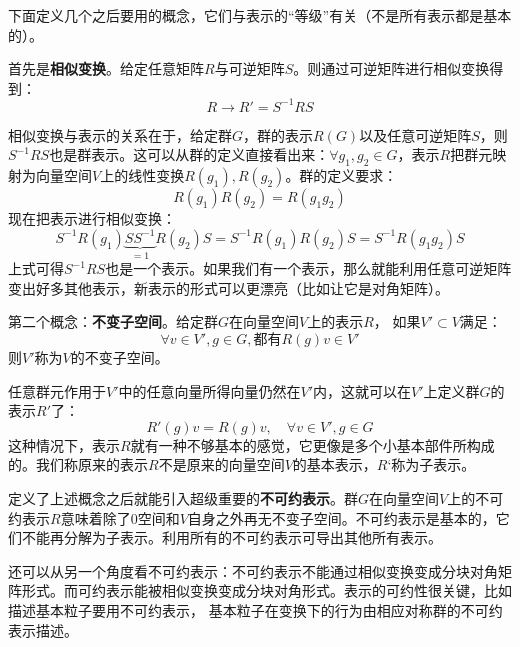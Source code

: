 下面定义几个之后要用的概念，它们与表示的“等级”有关（不是所有表示都是基本的）。


首先是{\bf 相似变换}。给定任意矩阵$R$与可逆矩阵$S$。则通过可逆矩阵进行相似变换得到：
\begin{equation}
\label{equ3.89}
R \rightarrow R' = S^{-1} RS
\end{equation}

相似变换与表示的关系在于，给定群$G$，群的表示$R(G)$以及任意可逆矩阵$S$，则$S^{-1} RS$也是群表示。这可以从群的定义直接看出来：$\forall g_1, g_2 \in G$，表示$R$把群元映射为向量空间$V$上的线性变换$R(g_1),R(g_2)$。群的定义要求：
\begin{equation}
\label{equ3.90}
R(g_1) R(g_2) = R(g_1 g_2)
\end{equation}
现在把表示进行相似变换：
\begin{equation}
\label{equ3.91}
S^{-1} R(g_1) \underbrace{SS^{-1}}_{=1} R(g_2) S = S^{-1} R(g_1) R(g_2) S = S^{-1} R(g_1 g_2) S
\end{equation}
上式可得$S^{-1} RS$也是一个表示。如果我们有一个表示，那么就能利用任意可逆矩阵变出好多其他表示，新表示的形式可以更漂亮（比如让它是对角矩阵）。

第二个概念：{\bf 不变子空间}。给定群$G$在向量空间$V$上的表示$R$， 如果$V' \subset V$满足：
\[
\forall v \in V', g \in G, \text{都有} R(g)v \in V'
\]
则$V'$称为$V$的不变子空间。

任意群元作用于$V'$中的任意向量所得向量仍然在$V'$内，这就可以在$V'$上定义群$G$的表示$R'$了：
\begin{equation}
\label{equ3.92}
R'(g) v = R(g) v,\quad \forall v \in V', g \in G
\end{equation}
这种情况下，表示$R$就有一种不够基本的感觉，它更像是多个小基本部件所构成的。我们称原来的表示$R$不是原来的向量空间$V$的基本表示，$R‘$称为子表示。%

定义了上述概念之后就能引入超级重要的{\bf 不可约表示}。群$G$在向量空间$V$上的不可约表示$R$意味着除了$0$空间和$V$自身之外再无不变子空间。不可约表示是基本的，它们不能再分解为子表示。利用所有的不可约表示可导出其他所有表示。

还可以从另一个角度看不可约表示：不可约表示不能通过相似变换变成分块对角矩阵形式。而可约表示能被相似变换变成分块对角形式。表示的可约性很关键，比如描述基本粒子要用不可约表示，%
基本粒子在变换下的行为由相应对称群的不可约表示描述。

